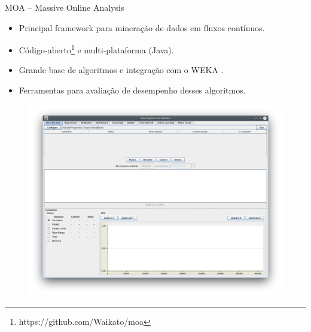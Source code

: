 \documentclass[10pt]{beamer}
\begin{document}
\begin{frame}{MOA – Massive Online Analysis}
    \begin{itemize}
        \item Principal framework para mineração de dados em fluxos contínuos.
        \item Código-aberto\footnote{https://github.com/Waikato/moa} e multi-plataforma (Java).
        \item Grande base de algoritmos e integração com o WEKA \cite{Hall:2009:WDM:1656274.1656278}.
        \item Ferramentas para avaliação de desempenho desses algoritmos.
    \end{itemize}

    \begin{figure}[H]
        \begin{center}
            \includegraphics[scale=0.24]{imagens/moa.png}
        \end{center}
    \end{figure}
\end{frame}
\end{document}
